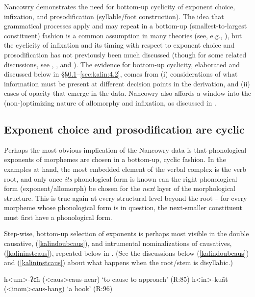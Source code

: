 \documentclass[output=paper]{langscibook}
\begin{document}
Nancowry demonstrates the need for bottom-up cyclicity of exponent choice, infixation, and prosodification (syllable/foot construction). The idea that grammatical processes apply and may repeat in a bottom-up (smallest-to-largest constituent) fashion is a common assumption in many theories (see, e.g., \citealt{ChomskyHalle68,Kiparsky82,Kiparsky00,Carstairs87,Anderson92,Bobaljik00,Wolf08,Embick10,BS12}), but the cyclicity of infixation and its timing with respect to exponent choice and prosodification has not previously been  much discussed (though for some related discussions, see  \citealt[\S3.4.3]{Embick10}, \citealt{BF16}, and \citealt{Harizanov17}). The evidence for bottom-up cyclicity, elaborated and discussed below in \S\S\ref{sec:kalin:4.1}--\ref{sec:kalin:4.2}, comes from (i) considerations of what information must be present at different decision points in the derivation, and (ii) cases of opacity that emerge in the data. Nancowry also affords a window into the (non-)optimizing nature of allomorphy and infixation, as discussed in .

\subsection{Exponent choice and prosodification are cyclic}\label{sec:kalin:4.1}

Perhaps the most obvious implication of the Nancowry data is that phonological exponents of morphemes are chosen in a bottom-up, cyclic fashion. In the examples at hand, the most embedded element of the verbal complex is the verb root, and only once {\it its} phonological form is known can the right phonological form (exponent/allomorph) be chosen for the {\it next} layer of the morphological structure. This is true again at every structural level beyond the root -- for every morpheme whose phonological form is in question, the next-smaller constituent must first have a phonological form. 

Step-wise, bottom-up selection of exponents is perhaps most visible in the double causative, (\ref{kalindoubcaus}), and intrumental nominalizations of causatives, (\ref{kalininstcaus}), repeated below in \Next. (See the  discussions below (\ref{kalindoubcaus}) and  (\ref{kalininstcaus}) about what happens when the root/stem is disyllabic.)

\ea \label{kalin16}
\ea h<um>-ʔ\~εh ({\sc <caus>}{\sc caus-}near) \hfill  `to cause to approach'  (R:85)\label{kalin16a}
\ex h<in>-ku\~at  ({\sc <inom>}{\sc caus-}hang) \hfill `a hook' (R:96) \label{kalin16b}
\z
\z
\end{document}
